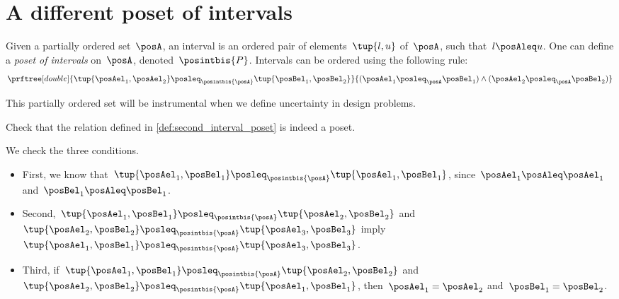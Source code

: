 

\section{A different poset of intervals}
\begin{definition}
    \label{def:second_interval_poset}
    Given a partially ordered set~$\posA$, an interval is an ordered pair of elements~$\tup{l,u}$ of~$\posA$, such that~$l\posAleq u$.
    One can define a \emph{poset of intervals} on~$\posA$, denoted~$\posintbis{P}$. Intervals can be ordered using the following rule:
    \begin{equation}
        \prftree[double]{\tup{\posAel_1,\posAel_2}\posleq_{\posintbis{\posA}}\tup{\posBel_1,\posBel_2}}{(\posAel_1\posleq_\posA \posBel_1) \wedge (\posAel_2\posleq_\posA \posBel_2)}
    \end{equation}
\end{definition}

This partially ordered set will be instrumental when we define uncertainty in design problems.

\begin{exercise}
    Check that the relation defined in \cref{def:second_interval_poset} is indeed a poset.
\end{exercise}
\begin{solution}
    We check the three conditions.
    \begin{itemize}
        \item First, we know that~$\tup{\posAel_1,\posBel_1}\posleq_{\posintbis{\posA}}\tup{\posAel_1,\posBel_1}$, since~$\posAel_1\posAleq \posAel_1$ and~$\posBel_1\posAleq \posBel_1$.
        \item Second,~$\tup{\posAel_1,\posBel_1}\posleq_{\posintbis{\posA}}\tup{\posAel_2,\posBel_2}$ and~$\tup{\posAel_2,\posBel_2}\posleq_{\posintbis{\posA}}\tup{\posAel_3,\posBel_3}$ imply~$\tup{\posAel_1,\posBel_1}\posleq_{\posintbis{\posA}}\tup{\posAel_3,\posBel_3}$.
        \item Third, if~$\tup{\posAel_1,\posBel_1}\posleq_{\posintbis{\posA}}\tup{\posAel_2,\posBel_2}$ and~$\tup{\posAel_2,\posBel_2}\posleq_{\posintbis{\posA}}\tup{\posAel_1,\posBel_1}$, then~$\posAel_1=\posAel_2$ and~$\posBel_1=\posBel_2$.
    \end{itemize}
\end{solution}
